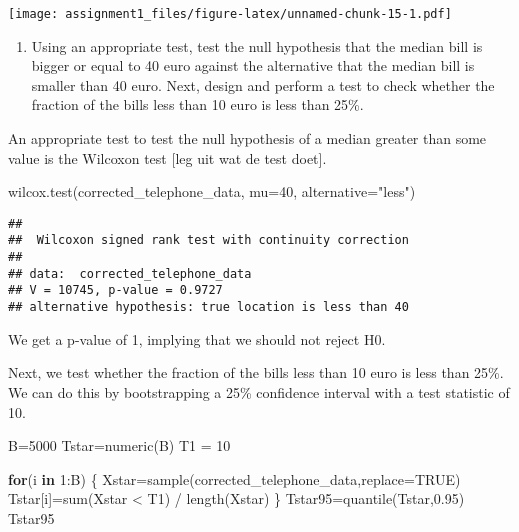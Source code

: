 \documentclass[
]{article}
\newenvironment{Shaded}{\begin{snugshade}}{\end{snugshade}}
\newcommand{\AttributeTok}[1]{\textcolor[rgb]{0.77,0.63,0.00}{#1}}
\newcommand{\ConstantTok}[1]{\textcolor[rgb]{0.00,0.00,0.00}{#1}}
\newcommand{\ControlFlowTok}[1]{\textcolor[rgb]{0.13,0.29,0.53}{\textbf{#1}}}
\newcommand{\DecValTok}[1]{\textcolor[rgb]{0.00,0.00,0.81}{#1}}
\newcommand{\FloatTok}[1]{\textcolor[rgb]{0.00,0.00,0.81}{#1}}
\newcommand{\FunctionTok}[1]{\textcolor[rgb]{0.00,0.00,0.00}{#1}}
\newcommand{\NormalTok}[1]{#1}
\newcommand{\OtherTok}[1]{\textcolor[rgb]{0.56,0.35,0.01}{#1}}
\newcommand{\SpecialCharTok}[1]{\textcolor[rgb]{0.00,0.00,0.00}{#1}}
\newcommand{\StringTok}[1]{\textcolor[rgb]{0.31,0.60,0.02}{#1}}
\providecommand{\tightlist}{%
  \setlength{\itemsep}{0pt}\setlength{\parskip}{0pt}}
\begin{document}
\texttt{[image: assignment1\_files/figure-latex/unnamed-chunk-15-1.pdf]}

\begin{enumerate}
\def\labelenumi{\alph{enumi})}
\setcounter{enumi}{4}
\tightlist
\item
  Using an appropriate test, test the null hypothesis that the median
  bill is bigger or equal to 40 euro against the alternative that the
  median bill is smaller than 40 euro. Next, design and perform a test
  to check whether the fraction of the bills less than 10 euro is less
  than 25\%.
\end{enumerate}

An appropriate test to test the null hypothesis of a median greater than
some value is the Wilcoxon test {[}leg uit wat de test doet{]}.

\begin{Shaded}
\begin{Highlighting}[]
\FunctionTok{wilcox.test}\NormalTok{(corrected\_telephone\_data, }\AttributeTok{mu=}\DecValTok{40}\NormalTok{, }\AttributeTok{alternative=}\StringTok{"less"}\NormalTok{)}
\end{Highlighting}
\end{Shaded}

\begin{verbatim}
## 
##  Wilcoxon signed rank test with continuity correction
## 
## data:  corrected_telephone_data
## V = 10745, p-value = 0.9727
## alternative hypothesis: true location is less than 40
\end{verbatim}

We get a p-value of 1, implying that we should not reject H0.

Next, we test whether the fraction of the bills less than 10 euro is
less than 25\%. We can do this by bootstrapping a 25\% confidence
interval with a test statistic of 10.

\begin{Shaded}
\begin{Highlighting}[]
\NormalTok{B}\OtherTok{=}\DecValTok{5000}
\NormalTok{Tstar}\OtherTok{=}\FunctionTok{numeric}\NormalTok{(B)}
\NormalTok{T1 }\OtherTok{=} \DecValTok{10}

\ControlFlowTok{for}\NormalTok{(i }\ControlFlowTok{in} \DecValTok{1}\SpecialCharTok{:}\NormalTok{B) \{}
\NormalTok{  Xstar}\OtherTok{=}\FunctionTok{sample}\NormalTok{(corrected\_telephone\_data,}\AttributeTok{replace=}\ConstantTok{TRUE}\NormalTok{)}
\NormalTok{  Tstar[i]}\OtherTok{=}\FunctionTok{sum}\NormalTok{(Xstar }\SpecialCharTok{\textless{}}\NormalTok{ T1) }\SpecialCharTok{/} \FunctionTok{length}\NormalTok{(Xstar)}
\NormalTok{  \}}
\NormalTok{Tstar95}\OtherTok{=}\FunctionTok{quantile}\NormalTok{(Tstar,}\FloatTok{0.95}\NormalTok{)}
\NormalTok{Tstar95}
\end{Highlighting}
\end{Shaded}
\end{document}
